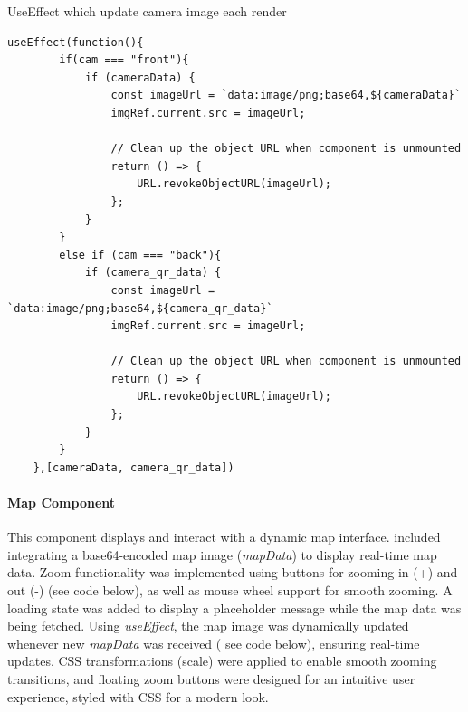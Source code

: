 \documentclass[../../main]{subfiles}
\begin{document}
\begin{codebox}[label=judFig12]{UseEffect which update camera image each render}
  \begin{verbatim}
useEffect(function(){
        if(cam === "front"){
            if (cameraData) {
                const imageUrl = `data:image/png;base64,${cameraData}`
                imgRef.current.src = imageUrl;

                // Clean up the object URL when component is unmounted
                return () => {
                    URL.revokeObjectURL(imageUrl);
                };
            }
        }
        else if (cam === "back"){
            if (camera_qr_data) {
                const imageUrl = `data:image/png;base64,${camera_qr_data}`
                imgRef.current.src = imageUrl;

                // Clean up the object URL when component is unmounted
                return () => {
                    URL.revokeObjectURL(imageUrl);
                };
            }
        }
    },[cameraData, camera_qr_data])
  \end{verbatim}
\end{codebox}

\paragraph{Map Component}

This component displays and interact with a dynamic map interface.
included integrating a base64-encoded map image (\emph{mapData}) to
display real-time map data. Zoom functionality was implemented using
buttons for zooming in (+) and out (-) (see code below), as well as mouse
wheel support for smooth zooming. A loading state was added to display a
placeholder message while the map data was being fetched. Using
\emph{useEffect}, the map image was dynamically updated whenever new
\emph{mapData} was received ( see code below), ensuring real-time
updates. CSS transformations (scale) were applied to enable smooth
zooming transitions, and floating zoom buttons were designed for an
intuitive user experience, styled with CSS for a modern look.
\end{document}
